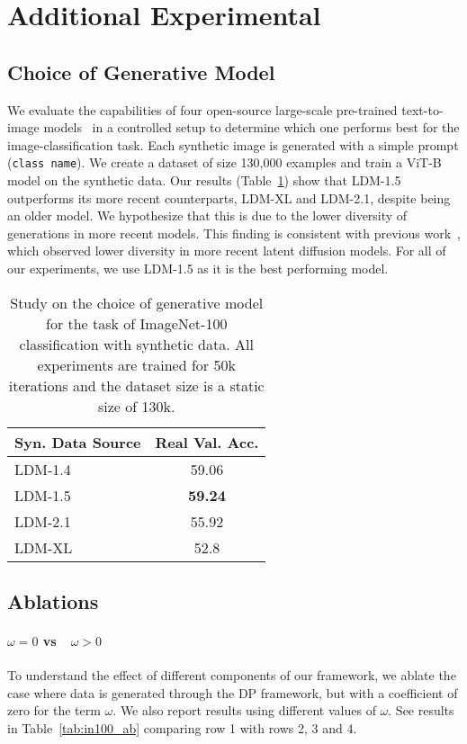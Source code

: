 \section{Additional Experimental}
\subsection{Choice of Generative Model}\label{app:choice_of_gens}
We evaluate the capabilities of four open-source large-scale pre-trained text-to-image models~\citep{rombach2022high} in a controlled setup to determine which one performs best for the image-classification task. Each synthetic image is generated with a simple prompt (\texttt{class name}). We create a dataset of size 130,000 examples and train a ViT-B model on the synthetic data. Our results (Table~\ref{tab:choice_of_gens}) show that LDM-1.5 outperforms its more recent counterparts, LDM-XL and LDM-2.1, despite being an older model. We hypothesize that this is due to the lower diversity of generations in more recent models. This finding is consistent with previous work~\citep{astolfi2024consistency}, which observed lower diversity in more recent latent diffusion models. For all of our experiments, we use LDM-1.5 as it is the best performing model.

\begin{table}[ht]
\vspace{-1em}
\centering
\caption{Study on the choice of generative model for the task of ImageNet-100 classification with synthetic data. All experiments are trained for 50k iterations and the dataset size is a static size of 130k.}\label{tab:choice_of_gens}
\vspace{0.4cm}
{\small
\begin{tabular}{lc}
\toprule
 Syn. Data Source&Real Val. Acc.\\ 
\midrule
\midrule
 LDM-1.4& 59.06  \\
 LDM-1.5&\textbf{59.24}  \\
 LDM-2.1& 55.92\\
 LDM-XL &52.8 \\
\bottomrule
\end{tabular}
}
\vspace{-1em}
\end{table}

\subsection{Ablations}\label{app:ablations}
\paragraph{$\omega=0$ vs\ \ $\omega>0$}
To understand the effect of different components of our framework, we ablate the case where data is generated through the DP framework, but with a coefficient of zero for the term $\omega$. We also report results using different values of $\omega$. See results in Table~\ref{tab:in100_ab} comparing row 1 with rows 2, 3 and 4.

